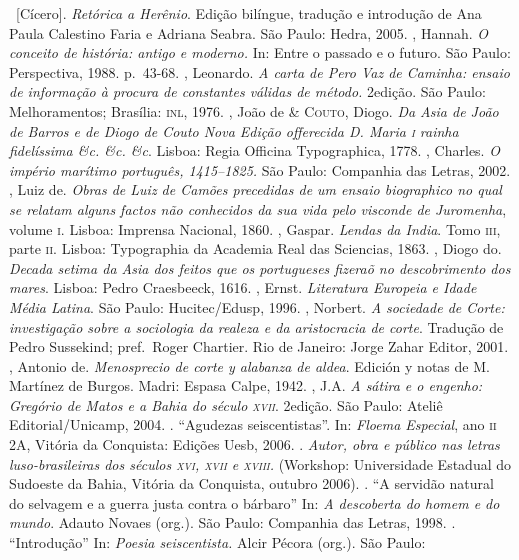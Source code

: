 \begin{bibliohedra}
\ [Cícero]. \textit{Retórica a Herênio}. Edição bilíngue, tradução
e introdução de Ana Paula Calestino Faria e Adriana Seabra. São Paulo:
Hedra, 2005.
, Hannah. \textit{O conceito de história: antigo e
moderno.} In: Entre o passado e o futuro. São Paulo: Perspectiva,
1988. p.~43-68. 
, Leonardo. \textit{A carta de Pero Vaz de Caminha: ensaio de
informação à procura de constantes válidas de método.} 2\ai edição. São
Paulo: Melhoramentos;  Brasília: \textsc{inl}, 1976.
, João de \& \textsc{Couto}, Diogo. \textit{Da Asia de João de Barros e de
Diogo de Couto Nova Edição offerecida D. Maria \textsc{i} rainha fidelíssima
\&c. \&c. \&c}. Lisboa: Regia Officina Typographica, 1778.
, Charles. \textit{O império marítimo português, 1415--1825. } São
Paulo: Companhia das Letras, 2002.
, Luiz de. \textit{Obras de Luiz de Camões precedidas de um ensaio
biographico no qual se relatam alguns factos não conhecidos da sua vida
pelo visconde de Juromenha}, volume \textsc{i}. Lisboa: Imprensa Nacional, 1860.
, Gaspar. \textit{Lendas da India}.
Tomo \textsc{iii}, parte \textsc{ii}. Lisboa: Typographia da Academia Real
das Sciencias, 1863.
, Diogo do. \textit{Decada setima da Asia dos feitos que os
portugueses fizeraõ no descobrimento dos mares}. Lisboa: Pedro Craesbeeck, 1616. 
, Ernst. \textit{Literatura Europeia e Idade Média Latina}. São
Paulo: Hucitec/Edusp, 1996.
, Norbert. \textit{A sociedade de Corte: investigação sobre a
sociologia da realeza e da aristocracia de corte}. Tradução de Pedro
Sussekind; pref.~Roger Chartier. Rio de Janeiro: Jorge Zahar
Editor, 2001.
, Antonio de. \textit{Menosprecio de corte y alabanza de aldea}.
Edición y notas de M. Martínez de Burgos. Madri: Espasa Calpe, 1942.
, J.A. \textit{A sátira e o engenho: Gregório de Matos e a Bahia
do século \textsc{xvii}}. 2\ai edição. São Paulo: Ateliê Editorial/Unicamp,
2004.
\titidem. ``Agudezas seiscentistas''. In: \textit{Floema
Especial}, ano \textsc{ii} 2A, Vitória da Conquista: Edições Uesb, 2006. 
\titidem. \textit{Autor, obra e público nas letras luso-brasileiras 
dos séculos \textsc{xvi, xvii} e \textsc{xviii}.} (Workshop: Universidade
Estadual do Sudoeste da Bahia, Vitória da Conquista, outubro 2006).
\titidem. ``A servidão natural do selvagem e a
guerra justa contra o bárbaro'' In:  \textit{A descoberta do homem e do mundo}. 
Adauto Novaes (org.). São Paulo: Companhia das Letras, 1998.
\titidem. ``Introdução'' In: \textit{Poesia seiscentista.} Alcir Pécora (org.). São Paulo:

\end{bibliohedra}
